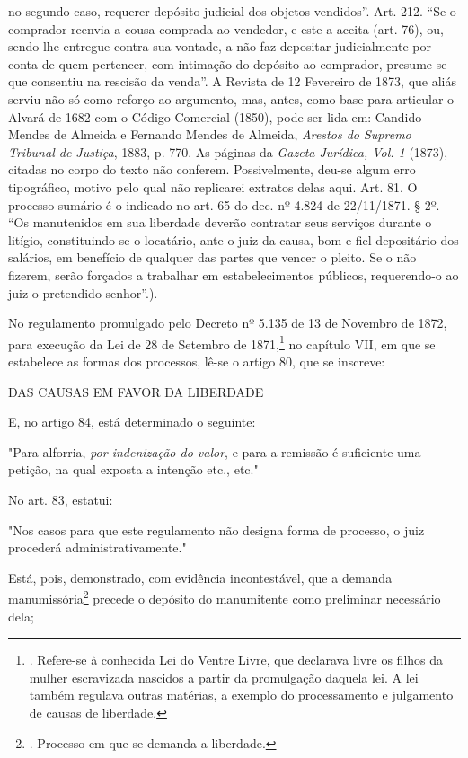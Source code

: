 {  no segundo caso, requerer depósito judicial dos objetos vendidos''.
  Art. 212. ``Se o comprador reenvia a cousa comprada ao vendedor, e
  este a aceita (art. 76), ou, sendo-lhe entregue contra sua vontade, a
  não faz depositar judicialmente por conta de quem pertencer, com
  intimação do depósito ao comprador, presume-se que consentiu na
  rescisão da venda''. A Revista de 12 Fevereiro de 1873, que aliás
  serviu não só como reforço ao argumento, mas, antes, como base para
  articular o Alvará de 1682 com o Código Comercial (1850), pode ser
  lida em: Candido Mendes de Almeida e Fernando Mendes de Almeida,
  \emph{Arestos do Supremo Tribunal de Justiça}, 1883, p. 770. As
  páginas da \emph{Gazeta Jurídica, Vol. 1} (1873), citadas no corpo do
  texto não conferem. Possivelmente, deu-se algum erro tipográfico,
  motivo pelo qual não replicarei extratos delas aqui. Art. 81. O
  processo sumário é o indicado no art. 65 do dec. nº 4.824 de
  22/11/1871. § 2º. ``Os manutenidos em sua liberdade deverão contratar
  seus serviços durante o litígio, constituindo-se o locatário, ante o
  juiz da causa, bom e fiel depositário dos salários, em benefício de
  qualquer das partes que vencer o pleito. Se o não fizerem, serão
  forçados a trabalhar em estabelecimentos públicos, requerendo-o ao
  juiz o pretendido senhor''.}).

No regulamento promulgado pelo Decreto nº 5.135 de 13 de Novembro de
1872, para execução da Lei de 28 de Setembro de 1871,\footnote{.
  Refere-se à conhecida Lei do Ventre Livre, que declarava livre os
  filhos da mulher escravizada nascidos a partir da promulgação daquela
  lei. A lei também regulava outras matérias, a exemplo do processamento
  e julgamento de causas de liberdade.} no capítulo VII, em que se
estabelece as formas dos processos, lê-se o artigo 80, que se inscreve:

DAS CAUSAS EM FAVOR DA LIBERDADE

E, no artigo 84, está determinado o seguinte:

"Para alforria, \emph{por indenização do valor}, e para a remissão é
suficiente uma petição, na qual exposta a intenção etc., etc."

No art. 83, estatui:

"Nos casos para que este regulamento não designa forma de processo, o
juiz procederá administrativamente."

Está, pois, demonstrado, com evidência incontestável, que a demanda
manumissória\footnote{. Processo em que se demanda a liberdade.} precede
o depósito do manumitente como preliminar necessário dela;

